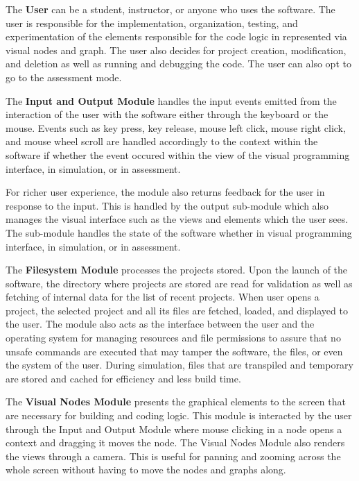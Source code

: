 \par
The \textbf{User} can be a student, instructor, or anyone who uses the software. The
user is responsible for the implementation, organization, testing, and experimentation
of the elements responsible for the code logic in represented via visual nodes and
graph. The user also decides for project creation, modification, and deletion as well
as running and debugging the code. The user can also opt to go to the assessment mode.

\par
The \textbf{Input and Output Module} handles the input events emitted from the interaction
of the user with the software either through the keyboard or the mouse. Events such as
key press, key release, mouse left click, mouse right click, and mouse wheel scroll are
handled accordingly to the context within the software if whether the event occured
within the view of the visual programming interface, in simulation, or in assessment.

\par
For richer user experience, the module also returns feedback for the user in
response to the input. This is handled by the output sub-module which also manages
the visual interface such as the views and elements which the user sees. The sub-module
handles the state of the software whether in visual programming interface, in simulation,
or in assessment.

\par
The \textbf{Filesystem Module} processes the projects stored. Upon the launch of the
software, the directory where projects are stored are read for validation as well as
fetching of internal data for the list of recent projects. When user opens a project,
the selected project and all its files are fetched, loaded, and displayed to the user.
The module also acts as the interface between the user and the operating system for
managing resources and file permissions to assure that no unsafe commands are executed
that may tamper the software, the files, or even the system of the user. During
simulation, files that are transpiled and temporary are stored and cached for efficiency
and less build time.

\par
The \textbf{Visual Nodes Module} presents the graphical elements to the screen that are
necessary for building and coding logic. This module is interacted by the user through
the Input and Output Module where mouse clicking in a node opens a context and dragging
it moves the node. The Visual Nodes Module also renders the views through a camera.
This is useful for panning and zooming across the whole screen without having to move
the nodes and graphs along.

